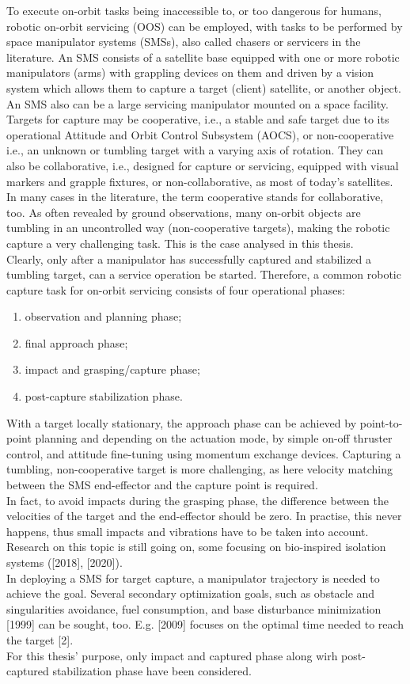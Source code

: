\documentclass[a4paper,12pt,oneside]{report}
\begin{document}
To execute on-orbit tasks being inaccessible to, or too dangerous for humans, robotic on-orbit servicing (OOS) can be employed, with tasks to be performed by space manipulator systems (SMSs), also called chasers or servicers in the literature. An SMS consists of a satellite base equipped with one or more robotic manipulators (arms) with grappling devices on them and driven by a vision system which allows them to capture a target (client) satellite, or another object. An SMS also can be a large servicing manipulator mounted on a space facility.\\
Targets for capture may be cooperative, i.e., a stable and safe target due to its operational Attitude and Orbit Control Subsystem (AOCS), or non-cooperative i.e., an unknown or tumbling target with a varying axis of rotation. They can also be collaborative, i.e., designed for capture or servicing, equipped with visual markers and grapple fixtures, or non-collaborative, as most of today’s satellites. In many cases in the literature, the term cooperative stands for collaborative, too.
As often revealed by ground observations, many on-orbit objects are tumbling in an uncontrolled way (non-cooperative targets), making the robotic capture a very challenging task. This is the case analysed in this thesis.\\
Clearly, only after a manipulator has successfully captured and stabilized a tumbling target, can a service operation be started. Therefore, a common robotic capture task for on-orbit servicing consists of four operational phases: 
\begin{enumerate}
  \item observation and planning phase;
  \item final approach phase;
  \item impact and grasping/capture phase;
  \item post-capture stabilization phase.
\end{enumerate}
With a target locally stationary, the approach phase can be achieved by point-to-point planning and depending on the actuation mode, by simple on-off thruster control, and attitude fine-tuning using momentum exchange devices. Capturing a tumbling, non-cooperative target is more challenging, as here velocity matching between the SMS end-effector and the capture point is required.\\
In fact, to avoid impacts during the grasping phase, the difference between the velocities of the target and the end-effector should be zero. In practise, this never happens, thus small impacts and vibrations have to be taken into account. Research on this topic is still going on, some focusing on bio-inspired isolation systems ([2018], [2020]).\\
In deploying a SMS for target capture, a manipulator trajectory is needed to achieve the goal. Several secondary optimization goals, such as obstacle and singularities avoidance, fuel consumption, and base disturbance minimization [1999] can be sought, too. E.g. [2009] focuses on the optimal time needed to reach the target [2].\\
For this thesis' purpose, only impact and captured phase along wirh post-captured stabilization phase have been considered.
\newpage
\end{document}
